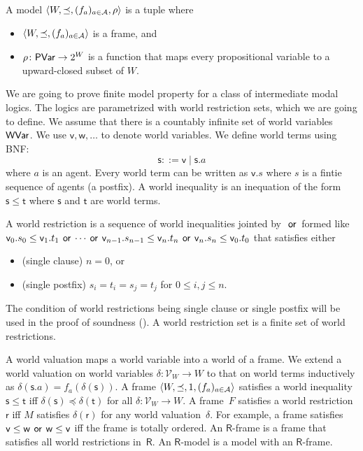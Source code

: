   \begin{definition}
   A model $\langle{W,\preceq, (f_a)_{a\in \mathcal A},\rho}\rangle$ is a tuple where
   \begin{itemize}
    \item $\langle{W,\preceq,(f_a)_{a\in \mathcal A}}\rangle$ is a frame, and
    \item $\rho\colon \mathsf{PVar}\rightarrow 2^W$ is a function that maps every
	  propositional variable to a upward-closed subset of $W\!$.
   \end{itemize}
  \end{definition}

  We are going to prove finite model property for a class of
  intermediate modal logics.  The logics are parametrized with
  world restriction sets,  which we are going to define.
  We assume that there is a countably infinite set of world variables~$\mathsf{WVar}$.
  We use $\mathsf v, \mathsf w,\ldots$ to denote world variables.
  We define world terms using BNF:
  \[
  \mathsf s::=\mathsf v\mid \mathsf s.a
  \]
  where $a$ is an agent.
  Every world term can be written as $\mathsf v.s$ where $s$ is a fintie sequence
  of agents (a postfix).
  A world inequality is an inequation of the form $\mathsf s\le
  \mathsf t$ where $\mathsf s$ and $\mathsf t$ are world terms.
  \begin{definition}
   A world restriction is a sequence of world inequalities jointed
   by~$\,\mathbin{\mathsf{or}}\,$ formed like
   $\mathsf v_0.s_0\le\mathsf v_1.t_1\,\mathbin{\mathsf{or}}\,\cdots\,\mathbin{\mathsf{or}}\,
   \mathsf v_{n-1}.s_{n-1}\le\mathsf v_n.t_n\,\mathbin{\mathsf{or}}\, \mathsf v_n.s_n\le\mathsf
   v_0.t_0$ that satisfies either
   \begin{itemize}
    \item (single clause) $n=0$, or
    \item (single postfix) $s_i = t_i = s_j = t_{j}$ for $0\le i,j\le n$.
   \end{itemize}
  \end{definition}
  The condition of world restrictions being single clause or single
  postfix will be used in the proof of soundness ().
  A world restriction set is a finite set of world restrictions.

  A world valuation maps a world variable into a world of a frame.
  We extend a world valuation on world variables
  $\delta\colon\mathcal V_W\rightarrow W$ to that on world terms
  inductively as $\delta(\mathsf s.a)=f_a(\delta(\mathsf s))$.
  A frame $\langle{W,\preceq, 1,(f_a)_{a\in\mathcal A}}\rangle$ satisfies a world inequality
  $\mathsf s\le\mathsf t$ iff $\delta(\mathsf s)\preceq \delta(\mathsf t)$
  for all $\delta\colon\mathcal V_W\rightarrow W$.
  A frame~$F$ satisfies a world restriction $\mathsf r$
  iff $M$ satisfies $\delta(\mathsf r)$ for any world valuation~$\delta$.
  For example, a frame satisfies $\mathsf v\le \mathsf w\,\mathbin{\mathsf{or}}\,\mathsf
  w\le\mathsf v$ iff the frame is totally ordered.
  An $\mathsf R$-frame is a frame that
  satisfies all world restrictions in~$\mathsf R$.
  An $\mathsf R$-model is a model with an $\mathsf R$-frame.


